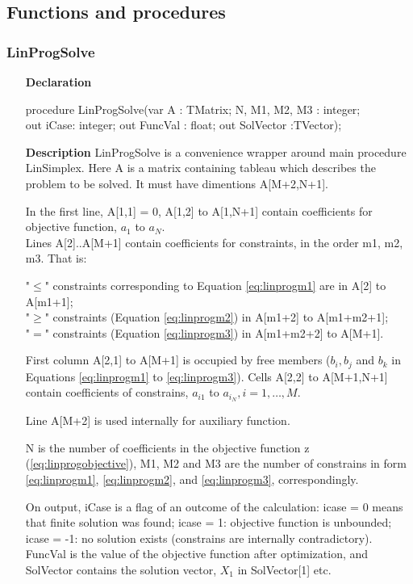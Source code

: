 \documentclass[12pt,a4paper,oneside]{report}
\newcommand{\declarationitem}[1]{\textbf{#1}}
\newcommand{\descriptiontitle}[1]{\textbf{#1}}
\begin{document}
\subsection{Functions and procedures}
\subsubsection{LinProgSolve}
\label{linprog:LinProgSolve}
\begin{itemize}
	\item[\declarationitem{Declaration}\hfill]
	\begin{flushleft}
procedure LinProgSolve(var A : TMatrix; N, M1, M2, M3 : integer;\\
out iCase: integer; out FuncVal : float; out SolVector :TVector);
	\end{flushleft}
	\item[\descriptiontitle{Description}\hfill]
	LinProgSolve is a convenience wrapper around main procedure LinSimplex. Here A is a matrix containing tableau which describes the problem to be solved. It must have dimentions A[M+2,N+1]. 
	
	In the first line, A[1,1] = 0, A[1,2] to A[1,N+1] contain  coefficients for objective function, $a_1$ to $a_N$.\\
	Lines A[2]..A[M+1] contain coefficients for constraints, in the order m1, m2, m3. That is:
	
	"$\leq$" constraints corresponding to Equation \ref{eq:linprogm1} are in A[2] to A[m1+1];\\
	"$\geq$" constraints (Equation \ref{eq:linprogm2}) in A[m1+2] to A[m1+m2+1];\\
	"$=$" constraints (Equation \ref{eq:linprogm3})    in A[m1+m2+2] to A[M+1].
	
	First column A[2,1] to A[M+1] is occupied by free members ($b_i,b_j$ and $b_k$ in Equations \ref{eq:linprogm1} to \ref{eq:linprogm3}). Cells A[2,2] to A[M+1,N+1] contain coefficients of constrains, $a_{i1}$ to $a_{i_N}, i=1,\dots,M$.

	Line A[M+2] is used internally for auxiliary function. 
	
	N is the number of coefficients in the objective function z (\ref{eq:linprogobjective}), M1, M2 and M3 are the number of constrains in form \ref{eq:linprogm1}, \ref{eq:linprogm2}, and \ref{eq:linprogm3}, correspondingly. 
	
	On output, iCase is a flag of an outcome of the calculation: icase = 0 means that finite solution was found; icase = 1: objective function is unbounded;	icase = -1: no solution exists (constrains are internally contradictory). \mbox{FuncVal} is the value of the objective function after optimization, and SolVector contains the solution vector, $X_1$ in SolVector[1] etc.
\end{itemize}
\end{document}
